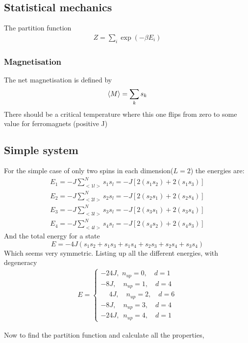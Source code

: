 \documentclass[11pt,a4paper,english]{article}
\numberwithin{equation}{section}
\begin{document}
\subsection{Statistical mechanics}
The partition function
\begin{gather}
Z = \sum_i \exp(-\beta E_i)
\end{gather}

\subsubsection{Magnetisation}

The net magnetisation is defined by
\begin{gather}
\expval{M} = \sum_k s_k
\end{gather}
There should be a critical temperature where this one flips from 
zero to some value for ferromagnets (positive J)


\subsection{Simple system}
For the simple case of only two spins in each dimension($L=2$) the energies are:
\begin{align*}
E_1 = -J\sum_{<1l>}^{N}s_1 s_l = -J[2(s_1 s_2)+2(s_1 s_3)] \\
E_2 = -J\sum_{<2l>}^{N}s_2 s_l = -J[2(s_2 s_1)+2(s_2 s_4)] \\
E_3 = -J\sum_{<3l>}^{N}s_3 s_l = -J[2(s_3 s_1)+2(s_3 s_4)] \\
E_4 = -J\sum_{<4l>}^{N}s_4 s_l = -J[2(s_4 s_2)+2(s_4 s_3)] 
\end{align*}
And the total energy for a state 
\begin{equation}
E = -4J(s_1s_2 + s_1s_3 + s_1s_4 + s_2s_3 + s_2s_4 + s_3s_4)
\end{equation}
Which seems very symmetric. Listing up all the different energies,
with degeneracy
\begin{gather*}
 E = 
\begin{cases}
-24J,\,\,n_{up} = 0,\quad d = 1\\
-8J,\quad n_{up} = 1,\quad d = 4\\
\phantom{-}4J, \quad n_{up} = 2, \quad d = 6\\
-8J,\quad n_{up} = 3, \quad d= 4\\
-24J,\,\,\,n_{up} = 4, \quad d = 1
\end{cases}
\end{gather*}

Now to find the partition function and calculate all the properties,
\end{document}
